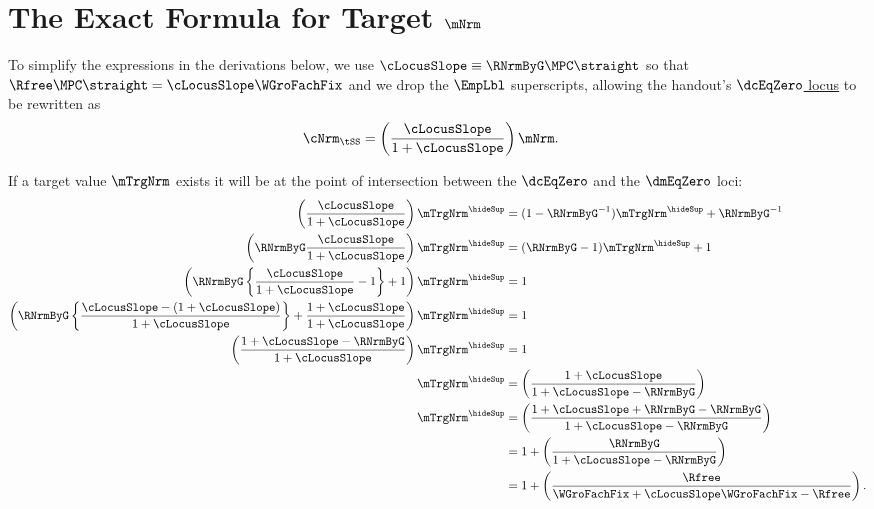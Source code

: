\documentclass{econark}
\begin{document}
\section{The Exact Formula for Target $\mNrm$}\label{sec:mTargExact}

To simplify the expressions in the derivations below, we use $\cLocusSlope \equiv \RNrmByG \MPC \straight$ so that $\Rfree \MPC \straight = \cLocusSlope \WGroFachFix$ and we drop the $\EmpLbl$ superscripts, allowing the handout's \hyperref[eq:cDelEqZero]{$\dcEqZero$ locus} to be rewritten as 
\begin{equation}\begin{gathered}\begin{aligned}
  \cNrm_{\tSS} & =  \left(\frac{\cLocusSlope }{1+\cLocusSlope}\right)\mNrm .
\end{aligned}\end{gathered}\end{equation}

If a target value $\mTrgNrm$ exists it will be at the point of intersection between the $\dcEqZero$ and the $\dmEqZero$ loci:
\begin{equation}\begin{gathered}\begin{aligned}
  \left(\frac{\cLocusSlope}{1+\cLocusSlope}\right)\mTrgNrm^{\hideSup} & =  (1-\RNrmByG^{-1})\mTrgNrm^{\hideSup}+\RNrmByG^{-1}
\\  \left(\RNrmByG\frac{\cLocusSlope}{1+\cLocusSlope}\right)\mTrgNrm^{\hideSup} & =  (\RNrmByG-1)\mTrgNrm^{\hideSup}+1
\\  \left(\RNrmByG\left\{\frac{\cLocusSlope}{1+\cLocusSlope}-1\right\}+1\right)\mTrgNrm^{\hideSup} & =  1
\\  \left(\RNrmByG\left\{\frac{\cLocusSlope-(1+\cLocusSlope)}{1+\cLocusSlope}\right\}+\frac{1+\cLocusSlope}{1+\cLocusSlope}\right)\mTrgNrm^{\hideSup} & =  1
\\  \left(\frac{1+\cLocusSlope-\RNrmByG}{1+\cLocusSlope}\right)\mTrgNrm^{\hideSup} & =  1
\\  \mTrgNrm^{\hideSup} & =  \left(\frac{1+\cLocusSlope}{1+\cLocusSlope-\RNrmByG}\right)
\\  \mTrgNrm^{\hideSup} & =  \left(\frac{1+\cLocusSlope+\RNrmByG-\RNrmByG}{1+\cLocusSlope-\RNrmByG}\right)
\\ & =  1 + \left(\frac{\RNrmByG}{1+\cLocusSlope-\RNrmByG}\right)
\\ & =  1 + \left(\frac{\Rfree}{\WGroFachFix+\cLocusSlope\WGroFachFix-\Rfree}\right)  \label{eq:mTarget}
.
\end{aligned}\end{gathered}\end{equation}
\end{document}
